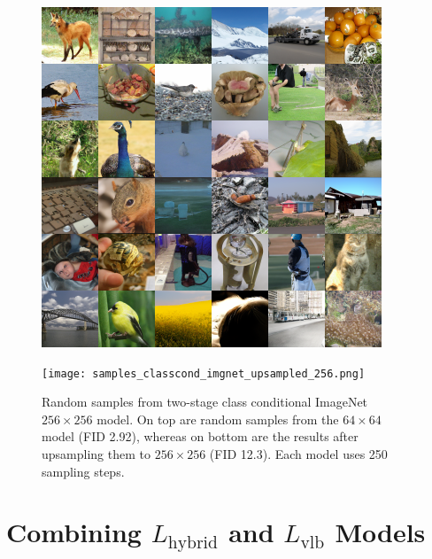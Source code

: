 \documentclass{article}
\begin{document}
\begin{figure}[ht]
    \centerline{\includegraphics[width=\columnwidth]{samples_classcond_imgnet_64.png}}
    \vskip 0.1in
    \centerline{\texttt{[image: samples\_classcond\_imgnet\_upsampled\_256.png]}}
    \caption{\label{fig:classcondtwostage}Random samples from two-stage class conditional ImageNet $256 \times 256$ model. On top are random samples from the $64 \times 64$ model (FID 2.92), whereas on bottom are the results after upsampling them to $256 \times 256$ (FID 12.3). Each model uses 250 sampling steps.}
    \vspace{1.5in}
\end{figure}

\clearpage

\section{Combining $L_{\text{hybrid}}$ and $L_{\text{vlb}}$ Models}
\end{document}

